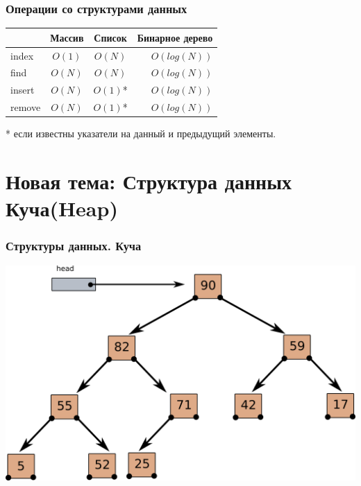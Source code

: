 \documentclass[10pt]{beamer}
\begin{document}
\begin{frame}[fragile]
\frametitle{Операции со структурами данных}
\begin{center}
  \begin{tabular}{  l | c c r }
      & Массив & Список & Бинарное дерево \\
    \hline
    index & $O(1)$ & $O(N)$ & $O(log(N))$ \\
    find & $O(N)$ & $O(N)$ & $O(log(N))$ \\
    insert & $O(N)$ & $O(1)$* & $O(log(N))$ \\
    remove & $O(N)$ & $O(1)$* & $O(log(N))$ \\
    \hline
  \end{tabular}
\end{center}
* если известны указатели на данный и предыдущий элементы.
\end{frame}

\section{Новая тема: Структура данных Куча(Heap)}



\begin{frame}[fragile]
\frametitle{Структуры данных. Куча} 
\begin{center}
\includegraphics[width=0.95\linewidth]{images/heap.png}
\end{center}
\end{frame}
\end{document}
